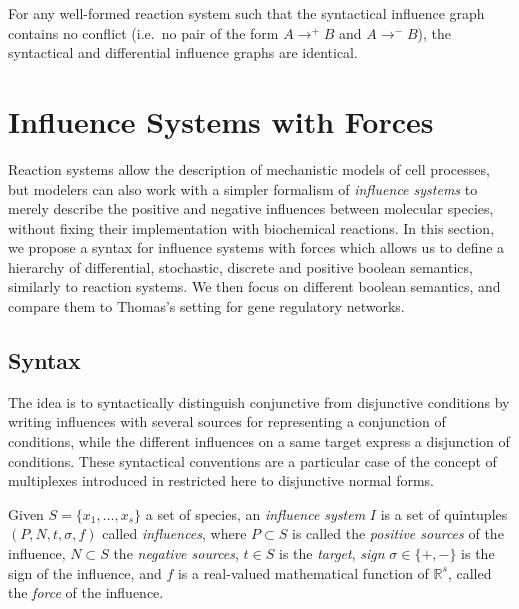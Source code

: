 \documentclass{llncs}
\newcommand{\ra}{\rightarrow}
\begin{document}
\begin{theorem}
For any well-formed reaction system
such that the syntactical influence graph contains no conflict (i.e.~no pair of the form $A\ra^+ B$ and $A\ra^- B$),
the syntactical and differential influence graphs are identical.
  \end{theorem}




\section{Influence Systems with Forces}

Reaction systems allow the description of mechanistic models of cell processes, but
modelers can also work with a simpler formalism of \emph{influence systems}
to merely describe the positive and negative influences between molecular species,
without fixing their implementation with biochemical reactions.
In this section, we propose a syntax for influence systems with forces which allows us to define
a hierarchy of differential, stochastic, discrete and positive boolean semantics, similarly to reaction systems.
We then focus on different boolean semantics, and compare them to Thomas's setting for gene regulatory networks.


\subsection{Syntax}

The idea is to syntactically distinguish conjunctive from disjunctive conditions by writing influences with several sources for representing a conjunction of conditions,
while the different influences on a same target express a disjunction of conditions.
These syntactical conventions are %
a particular case of the concept of multiplexes introduced in \cite{BCK08esm} restricted here to disjunctive normal forms.

\begin{definition}

   Given $S = \{x_1,\dots,x_s\}$ a set of species, an \emph{influence system}
   $I$ is a set of quintuples $(P, N, t, \sigma, f)$ called \emph{influences},
   where $P\subset S$ is called the \emph{positive sources} of the influence, $N\subset S$ the \emph{negative sources}, $t\in S$ is the \emph{target}, 
   \emph{sign} $\sigma\in\{+,-\}$ is the sign of the influence, and $f$ is a real-valued mathematical function
   of $\mathbb{R}^s$, called the \emph{force} of the influence.

\end{definition}
\end{document}
